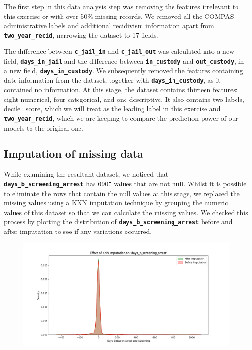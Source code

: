 The first step in this data analysis step was  removing the features irrelevant to this exercise or with over 50\% missing records. We removed all the COMPAS-administrative labels and additional recidivism information apart from \textbf{\texttt{two\_year\_recid}}, narrowing the dataset to 17 fields.

The difference between \textbf{\texttt{c\_jail\_in}} and \textbf{\texttt{c\_jail\_out}} was calculated into a new field, \textbf{\texttt{days\_in\_jail}} and the difference between \textbf{\texttt{in\_custody}} and \textbf{\texttt{out\_custody}}, in a new field, \textbf{\texttt{days\_in\_custody}}. We subsequently removed the features containing date information from the dataset, together with \textbf{\texttt{days\_in\_custody}}, as it contained no information. At this stage, the dataset contains thirteen features: eight numerical, four categorical, and one descriptive. It also contains two labels, decile\_score, which we will treat as the leading label in this exercise and \textbf{\texttt{two\_year\_recid}}, which we are keeping to compare the prediction power of our models to the original one.


\subsection{Imputation of missing data}

While examining the resultant dataset, we noticed that \textbf{\texttt{days\_b\_screening\_arrest}} has  6907 values that are not null. Whilst it is possible to eliminate the rows that contain the null values at this stage, we replaced the missing values using a KNN imputation technique by grouping the numeric values of this dataset so that we can calculate the missing values. We checked this process by plotting the distribution of \textbf{\texttt{days\_b\_screening\_arrest}} before and after imputation to see if any variations occurred.

\begin{figure}[H]
	\centering
	\includegraphics[width=0.9\linewidth]{img/imputation}
	\caption[Distribution \textbf{\texttt{days\_b\_screening\_arrest}} of before and after KNN imputation]{}
	\label{fig:imputation}
\end{figure}

